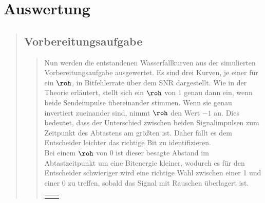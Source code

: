\section{Auswertung}
\begin{quote}
    
    \subsection{Vorbereitungsaufgabe}
    \begin{quote}
    
    Nun werden die entstandenen Wasserfallkurven aus der simulierten
    Vorbereitungsaufgabe ausgewertet. Es sind drei Kurven, je einer für ein
    $\roh$, in Bitfehlerrate über dem SNR dargestellt. Wie in der Theorie
    erläutert, stellt sich ein $\roh$ von $1$ genau dann ein, wenn beide
    Sendeimpulse übereinander stimmen. Wenn sie genau invertiert zueinander
    sind, nimmt $\roh$ den Wert $-1$ an. Dies bedeutet, dass der Unterschied
    zwischen beiden Signalimpulsen zum Zeitpunkt des Abtastens am größten ist.
    Daher fällt es dem Entscheider leichter das richtige Bit zu
    identifizieren.\\ 
    Bei einem $\roh$ von $0$ ist dieser besagte Abstand im Abtastzeitpunkt
    um eine Bitenergie kleiner, wodurch es für den Entscheider schwieriger wird
    eine richtige Wahl zwischen einer 1 und einer 0 zu treffen, sobald das
    Signal mit Rauschen überlagert ist. 
    
                \begin{center}
                \begin{tabular}{ll}
    
                \hspace{-12em}
                    \begin{minipage}{0.6\textwidth}
    

\end{minipage}
\end{tabular}
\end{center}
\end{quote}
\end{quote}
